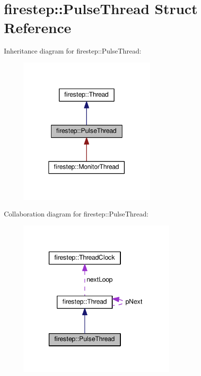 \hypertarget{structfirestep_1_1_pulse_thread}{\section{firestep\+:\+:Pulse\+Thread Struct Reference}
\label{structfirestep_1_1_pulse_thread}
}


Inheritance diagram for firestep\+:\+:Pulse\+Thread\+:\nopagebreak
\begin{figure}[H]
\begin{center}
\leavevmode
\includegraphics[width=196pt]{structfirestep_1_1_pulse_thread__inherit__graph}
\end{center}
\end{figure}


Collaboration diagram for firestep\+:\+:Pulse\+Thread\+:\nopagebreak
\begin{figure}[H]
\begin{center}
\leavevmode
\includegraphics[width=225pt]{structfirestep_1_1_pulse_thread__coll__graph}
\end{center}
\end{figure}
